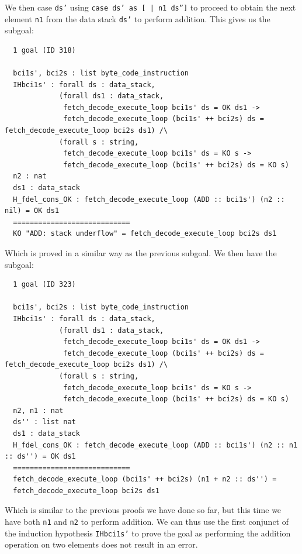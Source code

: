\documentclass{article}
\begin{document}
We then case \texttt{ds'} using \texttt{case ds' as [ | n1 ds'']} to proceed to obtain the next element \texttt{n1} from the data stack \texttt{ds'} to perform addition. This gives us the subgoal:

\begin{lstlisting}
  1 goal (ID 318)
  
  bci1s', bci2s : list byte_code_instruction
  IHbci1s' : forall ds : data_stack,
             (forall ds1 : data_stack,
              fetch_decode_execute_loop bci1s' ds = OK ds1 ->
              fetch_decode_execute_loop (bci1s' ++ bci2s) ds = fetch_decode_execute_loop bci2s ds1) /\
             (forall s : string,
              fetch_decode_execute_loop bci1s' ds = KO s ->
              fetch_decode_execute_loop (bci1s' ++ bci2s) ds = KO s)
  n2 : nat
  ds1 : data_stack
  H_fdel_cons_OK : fetch_decode_execute_loop (ADD :: bci1s') (n2 :: nil) = OK ds1
  ============================
  KO "ADD: stack underflow" = fetch_decode_execute_loop bci2s ds1
\end{lstlisting}

Which is proved in a similar way as the previous subgoal. We then have the subgoal:

\begin{lstlisting}
  1 goal (ID 323)
  
  bci1s', bci2s : list byte_code_instruction
  IHbci1s' : forall ds : data_stack,
             (forall ds1 : data_stack,
              fetch_decode_execute_loop bci1s' ds = OK ds1 ->
              fetch_decode_execute_loop (bci1s' ++ bci2s) ds = fetch_decode_execute_loop bci2s ds1) /\
             (forall s : string,
              fetch_decode_execute_loop bci1s' ds = KO s ->
              fetch_decode_execute_loop (bci1s' ++ bci2s) ds = KO s)
  n2, n1 : nat
  ds'' : list nat
  ds1 : data_stack
  H_fdel_cons_OK : fetch_decode_execute_loop (ADD :: bci1s') (n2 :: n1 :: ds'') = OK ds1
  ============================
  fetch_decode_execute_loop (bci1s' ++ bci2s) (n1 + n2 :: ds'') =
  fetch_decode_execute_loop bci2s ds1
\end{lstlisting}

Which is similar to the previous proofs we have done so far, but this time we have both \texttt{n1} and \texttt{n2} to perform addition. We can thus use the first conjunct of the induction hypothesis \texttt{IHbci1s'} to prove the goal as performing the addition operation on two elements does not result in an error.
\end{document}
